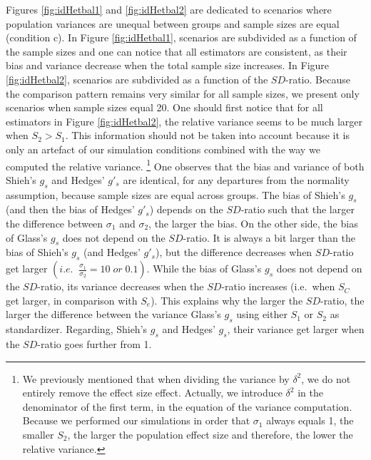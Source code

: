 \documentclass[
  man,floatsintext]{apa6}
\begin{document}
Figures \ref{fig:idHetbal1} and \ref{fig:idHetbal2} are dedicated to scenarios where population variances are unequal between groups and sample sizes are equal (condition c). In Figure \ref{fig:idHetbal1}, scenarios are subdivided as a function of the sample sizes and one can notice that all estimators are consistent, as their bias and variance decrease when the total sample size increases. In Figure \ref{fig:idHetbal2}, scenarios are subdivided as a function of the \(SD\)-ratio. Because the comparison pattern remains very similar for all sample sizes, we present only scenarios when sample sizes equal 20. One should first notice that for all estimators in Figure \ref{fig:idHetbal2}, the relative variance seems to be much larger when \(S_2>S_1\). This information should not be taken into account because it is only an artefact of our simulation conditions combined with the way we computed the relative variance. \footnote{We previously mentioned that when dividing the variance by $\delta^2$, we do not entirely remove the effect size effect. Actually, we introduce $\delta^2$ in the denominator of the first term, in the equation of the variance computation. Because we performed our simulations in order that $\sigma_1$ always equals 1, the smaller $S_2$, the larger the population effect size and therefore, the lower the relative variance.}
One observes that the bias and variance of both Shieh's \(g_s\) and Hedges' \(g'_s\) are identical, for any departures from the normality assumption, because sample sizes are equal across groups. The bias of Shieh's \(g_s\) (and then the bias of Hedges' \(g'_s\)) depends on the \(SD\)-ratio such that the larger the difference between \(\sigma_1\) and \(\sigma_2\), the larger the bias. On the other side, the bias of Glass's \(g_s\) does not depend on the \(SD\)-ratio. It is always a bit larger than the bias of Shieh's \(g_s\) (and Hedges' \(g'_s\)), but the difference decreases when \(SD\)-ratio get larger \(\left(i.e. \; \;\frac{\sigma_1}{\sigma_2} = 10 \; or \; 0.1\right)\). While the bias of Glass's \(g_s\) does not depend on the \(SD\)-ratio, its variance decreases when the \(SD\)-ratio increases (i.e.~when \(S_C\) get larger, in comparison with \(S_e\)). This explains why the larger the \(SD\)-ratio, the larger the difference between the variance Glass's \(g_s\) using either \(S_1\) or \(S_2\) as standardizer. Regarding, Shieh's \(g_s\) and Hedges' \(g_s\), their variance get larger when the \(SD\)-ratio goes further from 1.
\end{document}
